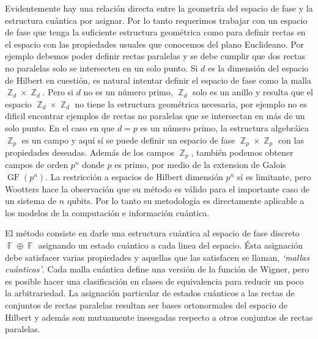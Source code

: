 \documentclass[a4paper,11pt]{report}
\DeclareMathOperator{\Z}{\mathbb{Z}}
\DeclareMathOperator{\F}{\mathbb{F}}
\DeclareMathOperator{\GF}{GF}
\begin{document}
  Evidentemente hay una relación directa entre la geometría
  del espacio de fase y la estructura cuántica por asignar.
  Por lo tanto requerimos trabajar con un espacio de fase
  que tenga la suficiente estructura geométrica como para
  definir rectas en el espacio con las propiedades usuales
  que conocemos del plano Euclideano.  Por ejemplo debemos
  poder definir rectas paralelas y se debe cumplir que dos
  rectas no paralelas solo se intersecten en un solo punto.
  Si $d$ es la dimensión del espacio de Hilbert en cuestión,
  es natural intentar definir el espacio de fase como la
  malla $\Z_d \times \Z_d$. Pero si $d$ no es un número
  primo, $\Z_d$ solo es un anillo y resulta que el espacio
  $\Z_d \times \Z_d$ no tiene la estructura geométrica
  necesaria, por ejemplo no es dificil encontrar ejemplos de
  rectas no paralelas que se intersectan en más de un solo
  punto. En el caso en que $d = p$ es un número primo, la
  estructura algebráica $\Z_p$ es un campo y aquí sí se
  puede definir un espacio de fase $\Z_p \times \Z_p$ con
  las propiedades deseadas.  Además de los campos $\Z_p$,
  también podemos obtener campos de orden $p^{n}$ donde $p$
  es primo, por medio de la extension de Galois
  $\GF\left(p^{n}\right)$.  La restricción a espacios de
  Hilbert dimensión $p^{n}$ sí es limitante, pero Wootters
  hace la observación que su método es válido para el
  importante caso de un sistema de $n$ qubits. Por lo tanto
  su metodología es directamente aplicable a los modelos de
  la computación e información cuántica.

  El método consiste en darle una estructura cuántica al
  espacio de fase discreto $\F \oplus \F$ asignando un
  estado cuántico a cada linea del espacio.  Ésta asignación
  debe satisfacer varias propiedades y aquellas que las
  satisfacen se llaman, \textit{`mallas cuánticas'}. Cada
  malla cuántica define una versión de la función de Wigner,
  pero es posible hacer una clasificación en clases de
  equivalencia para reducir un poco la arbitrariedad. La
  asignación particular de estados cuánticos a las rectas de
  conjuntos de rectas paralelas resultan ser bases
  ortonormales del espacio de Hilbert y además son
  mutuamente insesgadas respecto a otros conjuntos de rectas
  paralelas.
\end{document}
